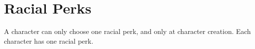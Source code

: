 \chapter{Racial Perks}
A character can only choose one racial perk, and only at character creation. Each character has one racial perk.

	
	
	
	
	
	
	
	
	
	
	
	
	
	
	
	
	